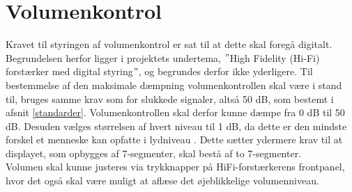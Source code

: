 \section{Volumenkontrol}
\label{valg_volumenkontrol}
Kravet til styringen af volumenkontrol er sat til at dette skal foregå digitalt. Begrundelsen herfor ligger i projektets undertema, $"$High Fidelity (Hi-Fi) forstærker med digital styring$"$, og begrundes derfor ikke yderligere. Til bestemmelse af den maksimale dæmpning volumenkontrollen skal være i stand til, bruges samme krav som for slukkede signaler, altså 50 dB, som bestemt i afsnit \ref{standarder}. Volumenkontrollen skal derfor kunne dæmpe fra  0 dB til 50 dB. Desuden vælges størrelsen af hvert niveau til 1 dB, da dette er den mindste forskel et menneske kan opfatte i lydniveau \cite{lidt_om_lyd}. Dette sætter ydermere krav til at displayet, som opbygges af 7-segmenter, skal bestå af to 7-segmenter.\\
Volumen skal kunne justeres via trykknapper på HiFi-forstærkerens frontpanel, hvor det også skal være muligt at aflæse det øjeblikkelige volumenniveau.  
